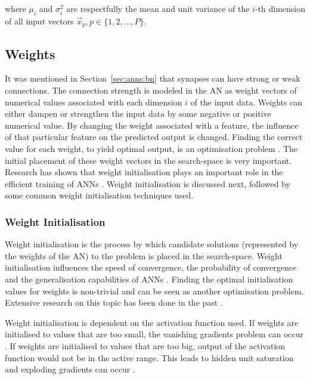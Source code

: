 \noindent where $\mu_i$ and $\sigma^2_i$ are respectfully the mean and unit
variance of the $i$-th dimension of all input vectors $\vec{x}_p, p \in \{1,2,
\dots, P\}$.

\subsection{Weights}
\label{sec:anns:an:weights}

It was mentioned in Section~\ref{sec:anns:bn} that synapses can
have strong or weak connections. The connection strength is modeled in the
\ac{AN} as weight vectors of numerical values associated with each dimension $i$
of the input data. Weights can either dampen or strengthen the input data by
some negative or positive numerical value. By changing the weight associated
with a feature, the influence of that particular feature on the predicted output
is changed. Finding the correct value for each weight, to yield optimal output,
is an optimisation problem \cite{ref:thierens:1993}. The initial placement of
these weight vectors in the search-space is very important. Research has shown
that weight initialisation plays an important role in the efficient training of
\acp{ANN} \cite{ref:thimm:1995}. Weight initialisation is discussed next,
followed by some common weight initialisation techniques used.

\subsubsection{Weight Initialisation}
\label{sec:anns:an:weights:initialisation}

Weight initialisation is the process by which candidate solutions (represented
by the weights of the \ac{AN}) to the problem is placed in the search-space.
Weight initialisation influences the speed of convergence, the probability of
convergence and the generalisation capabilities of \acp{ANN}
\cite{ref:fernandez:2001}. Finding the optimal initialisation values for weights
is non-trivial and can be seen as another optimisation problem. Extensive
research on this topic has been done in the past \cite{ref:de:2016,
ref:erdogmus:2003, ref:yam:2000}.

Weight initialisation is dependent on the
activation function used. If weights are initialised
to values that are too small, the vanishing gradients problem can occur
\cite{ref:hanin:2018}. If weights are initialised to values that are too big,
output of the activation function would not be in the active range. This leads
to hidden unit saturation and exploding gradients can occur
\cite{ref:hanin:2018, ref:yadav:2018}.

